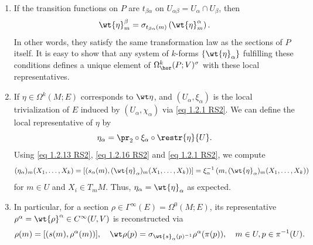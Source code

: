 \begin{rem}\label{rem 1.2.15 RS2}
    \begin{enumerate}
        \item If the transition functions on $P$ are $t_{\beta\alpha}$ on $U_{\alpha\beta}=U_\alpha\cap U_\beta$, then 
        \[\wt{\eta}_m^{\beta}=\sigma_{t_{\beta\alpha}(m)}\left(\wt{\eta}_m^{\alpha}\right). \label{eq transf law for hor forms}\]
        In other words, they satisfy the same transformation law as the sections of $P$ itself. It is easy to show that any system of $k$-forms $\{\wt{\eta}_\alpha\}$ fulfilling these conditions defines a unique element of $\Omega^k_{\hor}(P;V)^\sigma$ with these local representatives.
        
        \item If $\eta\in\Omega^k(M;E)$ corresponds to $\wt\eta$, and $(U_\alpha,\xi_\alpha)$ is the local trivialization of $E$ induced by $(U_\alpha,\chi_\alpha)$ via \eqref{eq 1.2.1 RS2}. We can define the local representative of $\eta$ by
        \[\eta_\alpha=\pr_2\circ\xi_\alpha\circ \restr{\eta}{U}.\]
        Using \eqref{eq 1.2.13 RS2}, \eqref{eq 1.2.16 RS2} and \eqref{eq 1.2.1 RS2}, we compute 
        \[(\eta_\alpha)_m(X_1,\ldots,X_k)=\left[\left(s_\alpha(m),(\wt{\eta}_\alpha)_m(X_1,\ldots,X_k)\right)\right]=\xi_\alpha^{-1}\left(m,(\wt{\eta}_\alpha)_m(X_1,\ldots,X_k)\right)\]
        for $m\in U$ and $X_i\in T_mM$. Thus, $\eta_\alpha=\wt{\eta}_\alpha$ as expected.

        \item In particular, for a section $\rho \in\Gamma^\infty(E)=\Omega^0(M;E)$, its representative $\rho^\alpha=\wt{\rho}^\alpha\in C^\infty(U,V)$ is reconstructed via
        \[\rho(m)=[(s(m),\rho^\alpha(m))],\quad \wt\rho(p)=\sigma_{\wt{s}_\alpha(p)^{-1}}\rho^\alpha(\pi(p)),\quad m\in U,p\in\pi^{-1}(U).\]
    \end{enumerate}
\end{rem}


